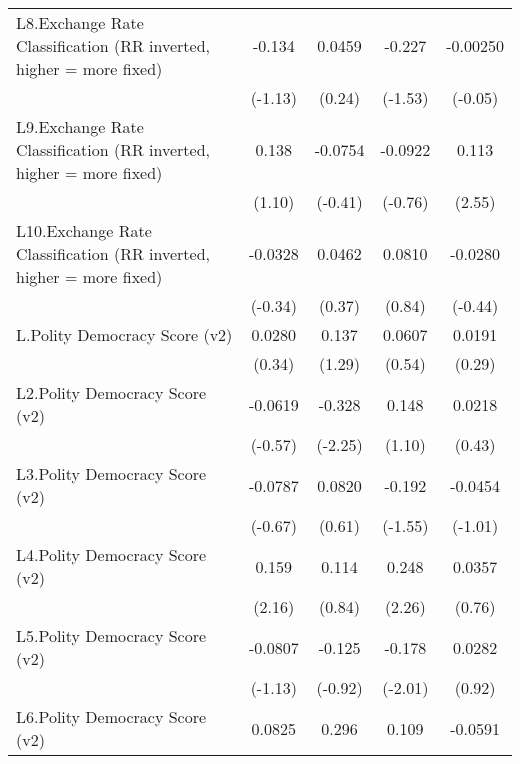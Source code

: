{\begin{longtable}{l*{4}{c}}
\addlinespace
L8.Exchange Rate Classification (RR inverted, higher = more fixed)&   -0.134         &   0.0459         &   -0.227         & -0.00250         \\
                &  (-1.13)         &   (0.24)         &  (-1.53)         &  (-0.05)         \\
\addlinespace
L9.Exchange Rate Classification (RR inverted, higher = more fixed)&    0.138         &  -0.0754         &  -0.0922         &    0.113\sym{*}  \\
                &   (1.10)         &  (-0.41)         &  (-0.76)         &   (2.55)         \\
\addlinespace
L10.Exchange Rate Classification (RR inverted, higher = more fixed)&  -0.0328         &   0.0462         &   0.0810         &  -0.0280         \\
                &  (-0.34)         &   (0.37)         &   (0.84)         &  (-0.44)         \\
\addlinespace
L.Polity Democracy Score (v2)&   0.0280         &    0.137         &   0.0607         &   0.0191         \\
                &   (0.34)         &   (1.29)         &   (0.54)         &   (0.29)         \\
\addlinespace
L2.Polity Democracy Score (v2)&  -0.0619         &   -0.328\sym{*}  &    0.148         &   0.0218         \\
                &  (-0.57)         &  (-2.25)         &   (1.10)         &   (0.43)         \\
\addlinespace
L3.Polity Democracy Score (v2)&  -0.0787         &   0.0820         &   -0.192         &  -0.0454         \\
                &  (-0.67)         &   (0.61)         &  (-1.55)         &  (-1.01)         \\
\addlinespace
L4.Polity Democracy Score (v2)&    0.159\sym{*}  &    0.114         &    0.248\sym{*}  &   0.0357         \\
                &   (2.16)         &   (0.84)         &   (2.26)         &   (0.76)         \\
\addlinespace
L5.Polity Democracy Score (v2)&  -0.0807         &   -0.125         &   -0.178\sym{*}  &   0.0282         \\
                &  (-1.13)         &  (-0.92)         &  (-2.01)         &   (0.92)         \\
\addlinespace
L6.Polity Democracy Score (v2)&   0.0825         &    0.296\sym{**} &    0.109         &  -0.0591         \\

\end{longtable}}
